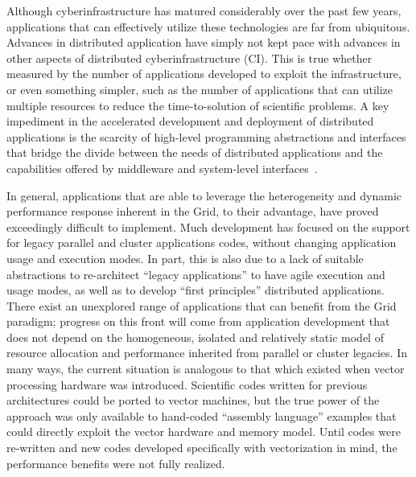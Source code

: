 \documentclass[10pt,letterpaper]{article}
\newcommand{\ci}{{cyberinfrastructure }}
\begin{document}
Although \ci has matured considerably over the past few years,
applications that can effectively utilize these technologies are far
from ubiquitous.  Advances in distributed application have simply not
kept pace with advances in other aspects of distributed
cyberinfrastructure (CI). This is true whether measured by the number
of  applications developed to exploit the infrastructure, or
even something simpler, such as the number of applications that can
utilize multiple resources to reduce the time-to-solution of
scientific problems.
A key impediment in the accelerated development and deployment of
distributed applications is the scarcity of high-level 
programming abstractions and interfaces that bridge the divide
between the needs of distributed applications and the capabilities
offered by middleware and system-level
interfaces~\cite{cloud-saga-paper}.


In general, applications that are able to leverage the heterogeneity
and dynamic performance response inherent in the Grid, to their
advantage, have proved exceedingly difficult to implement.  Much
development has focused on the support for legacy parallel and cluster
applications codes, without changing application usage and execution
modes.  In part, this is also due to a lack of suitable abstractions
to re-architect ``legacy applications'' to have agile execution and
usage modes, as well as to develop ``first principles'' distributed
applications.  There exist an unexplored range of applications that
can benefit from the Grid paradigm; progress on this front will come
from application development that does not depend on the homogeneous,
isolated and relatively static model of resource allocation and
performance inherited from parallel or cluster legacies.  In many
ways, the current situation is analogous to that which existed when
vector processing hardware was introduced.  Scientific codes written
for previous architectures could be ported to vector machines, but the
true power of the approach was only available to hand-coded ``assembly
language'' examples that could directly exploit the vector hardware
and memory model.  Until codes were re-written and new codes developed
specifically with vectorization in mind, the performance benefits were
not fully realized.
\end{document}
